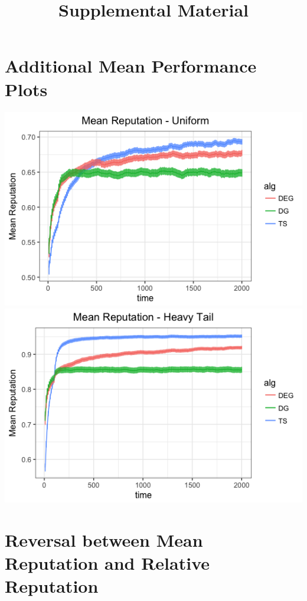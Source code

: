 \documentclass[11pt,letterpaper]{article}
\begin{document}
 

\title{Supplemental Material}
\date{}
\maketitle

\appendix
\section{Additional Mean Performance Plots}
\begin{center}
\includegraphics[scale=0.5]{figures/uniform_mean} \\
\includegraphics[scale=0.5]{figures/ht_mean}
\end{center}

\pagebreak
\section{Reversal between Mean Reputation and Relative Reputation}
\end{document}
